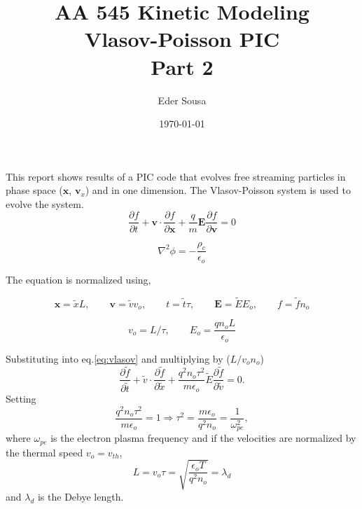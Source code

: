 \documentclass[12pt]{report}
\begin{document}
\title{AA 545 Kinetic Modeling\\ Vlasov-Poisson PIC\\ Part 2}
\author{Eder Sousa}
\date{\today}
\maketitle

This report shows results of a PIC code that evolves free streaming particles in phase space ($\mathbf{x}$, $\mathbf{v}_x$) and in one dimension.
The Vlasov-Poisson system is used to evolve the system.
\begin{equation}
\frac{\partial f}{\partial t} + \mathbf{v}\cdot\frac{\partial f}{\partial\mathbf{x}} + \frac{q}{m}\mathbf{E}\frac{\partial f}{\partial\mathbf{v}} = 0
\label{eq:vlasov}
\end{equation}

\begin{equation}
\nabla^2\phi = - \frac{\rho_c}{\epsilon_o}
\end{equation}

The equation is normalized using,

\begin{equation*}
\mathbf{x} = \tilde{x}L, \qquad \mathbf{v}=\tilde{v}v_o, \qquad t=\tilde{t}\tau, \qquad\mathbf{E}=\tilde{E}E_o, \qquad f = \tilde{f}n_o
\end{equation*}

\begin{equation*}
v_o=L/\tau, \qquad E_o = \frac{qn_oL}{\epsilon_o}
\end{equation*}

Substituting into eq.\ref{eq:vlasov} and multiplying by ($L/v_on_o$)
\begin{equation}
\frac{\partial \tilde{f}}{\partial \tilde{t}} + \tilde{v}\cdot\frac{\partial \tilde{f}}{\partial\tilde{x}} + \frac{q^2n_o\tau^2}{m\epsilon_o}\tilde{E}\frac{\partial\tilde{f}}{\partial\tilde{v}} = 0.
\end{equation}
Setting
\begin{equation*}
\frac{q^2n_o\tau^2}{m\epsilon_o} = 1 \Rightarrow \tau^2 = \frac{m\epsilon_o}{q^2n_o} = \frac{1}{\omega_{pe}^2},
\end{equation*}
where $\omega_{pe}$ is the electron plasma frequency and if the velocities are normalized by the thermal speed $v_o=v_{th}$,
\begin{equation*}
L = v_o\tau = \sqrt{\frac{\epsilon_o T}{q^2n_o}} = \lambda_d
\end{equation*}
and $\lambda_d$ is the Debye length.
\end{document}
